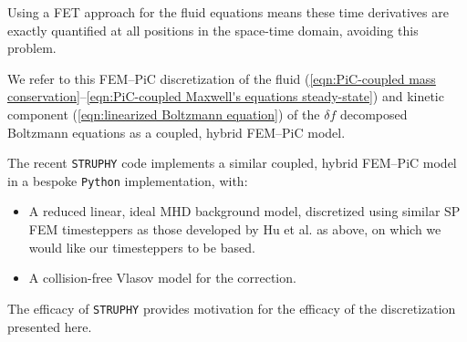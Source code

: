 \begin{itemize}
        Using a FET approach for the fluid equations means these time derivatives are exactly quantified at all positions in the space-time domain, avoiding this problem. 
    \end{itemize}

    We refer to this FEM--PiC discretization of the fluid (\ref{eqn:PiC-coupled mass conservation}--\ref{eqn:PiC-coupled Maxwell's equations steady-state}) and kinetic component (\ref{eqn:linearized Boltzmann equation}) of the $\delta\!f$ decomposed Boltzmann equations as a coupled, hybrid FEM--PiC model.

    The recent {\tt STRUPHY} code \cite{Holderied_Possanner_Wang_2021, Holderied_2022, Li_et_al_2023} implements a similar coupled, hybrid FEM--PiC model in a bespoke {\tt Python} implementation, with:
    \begin{itemize}
      \item  A reduced linear, ideal MHD background model, discretized using similar SP FEM timesteppers as those developed by Hu et al. \cite{Hu_Xu_2015, Hu_Ma_Xu_2017, Hu_Lee_Xu_2021, Green_et_al_2022, Laakmann_Farrell_Mitchell_22, Laakmann_Hu_Farrell_2022} as above, on which we would like our timesteppers to be based.
      \item  A collision-free Vlasov model for the correction.
    \end{itemize}
    The efficacy of {\tt STRUPHY} provides motivation for the efficacy of the discretization presented here.
    